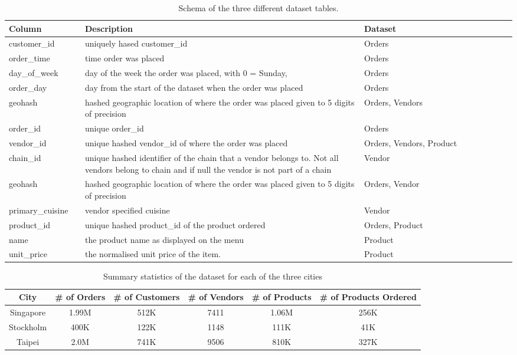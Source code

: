 \documentclass[manuscript]{acmart}
\begin{document}
\begin{table}
\begin{tabular}{|p{0.15\linewidth} | p{0.55\linewidth}| p{0.35\linewidth}}
Column & Description  & Dataset \\ \hline
customer\_id & uniquely hased customer\_id & Orders\\
order\_time & time order was placed & Orders \\
day\_of\_week & day of the week the order was placed, with 0 = Sunday,
 & Orders \\
order\_day & day from the start of the dataset when the order was placed
& Orders \\
geohash & hashed geographic location of where the order was placed given
to 5 digits of precision & Orders, Vendors\\
order\_id &  unique order\_id   & Orders\\
vendor\_id & unique hashed vendor\_id of where the order was placed &
Orders, Vendors, Product \\
chain\_id & unique hashed identifier of the chain that a vendor belongs
to. Not all vendors belong to chain and if null the vendor is not part of
a chain & Vendor\\
geohash & hashed geographic location of where the order was placed given
to 5 digits of precision & Orders, Vendor \\
primary\_cuisine & vendor specified cuisine & Vendor \\
product\_id & unique hashed product\_id of the product ordered & Orders,
Product\\
name & the product name as displayed on the menu  & Product\\
unit\_price & the normalised unit price of the item. & Product
\end{tabular}
\caption{Schema of the three different dataset tables.}
\label{table:schema}
\end{table}


\begin{table}
    \begin{tabular}{|cccccc|}
    City &  \# of Orders & \# of Customers &  \# of Vendors & \# of Products
    & \# of Products Ordered\\ \hline
    Singapore & 1.99M & 512K  &7411 & 1.06M & 256K \\
    Stockholm & 400K & 122K & 1148  &111K & 41K\\
    Taipei & 2.0M & 741K & 9506 & 810K & 327K
    \end{tabular}
    \caption{Summary statistics of the dataset for each of the three cities}
    \label{table:stats}
\end{table}
\end{document}
